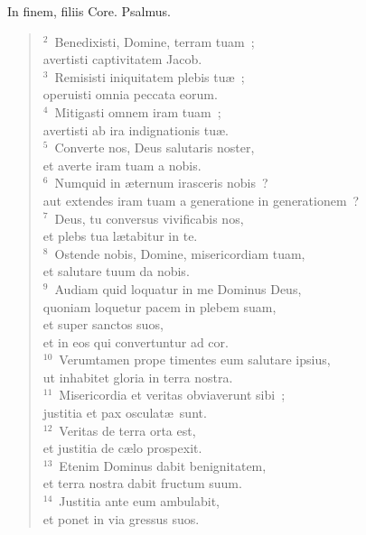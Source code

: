 \bchapter
\lettrine[lines=3,image=true,loversize=0.05,lraise=-0.03]{I}{}n finem, filiis Core. Psalmus.
\begin{flushleft}\begin{verse}\vspace{6pt}${}^{2}$~Benedixisti, Domine, terram tuam~;\\ avertisti captivitatem Jacob.\\
${}^{3}$~Remisisti iniquitatem plebis tu\ae~;\\ operuisti omnia peccata eorum.\\
${}^{4}$~Mitigasti omnem iram tuam~;\\ avertisti ab ira indignationis tu\ae .\\
${}^{5}$~Converte nos, Deus salutaris noster,\\ et averte iram tuam a nobis.\\
${}^{6}$~Numquid in \ae ternum irasceris nobis~?\\ aut extendes iram tuam a generatione in generationem~?\\
${}^{7}$~Deus, tu conversus vivificabis nos,\\ et plebs tua l\ae tabitur in te.\\
${}^{8}$~Ostende nobis, Domine, misericordiam tuam,\\ et salutare tuum da nobis.\\
${}^{9}$~Audiam quid loquatur in me Dominus Deus,\\ quoniam loquetur pacem in plebem suam,\\ et super sanctos suos,\\ et in eos qui convertuntur ad cor.\\
${}^{10}$~Verumtamen prope timentes eum salutare ipsius,\\ ut inhabitet gloria in terra nostra.\\
${}^{11}$~Misericordia et veritas obviaverunt sibi~;\\ justitia et pax osculat\ae\ sunt.\\
${}^{12}$~Veritas de terra orta est,\\ et justitia de c\ae lo prospexit.\\
${}^{13}$~Etenim Dominus dabit benignitatem,\\ et terra nostra dabit fructum suum.\\
${}^{14}$~Justitia ante eum ambulabit,\\ et ponet in via gressus suos.\end{verse}\end{flushleft}



